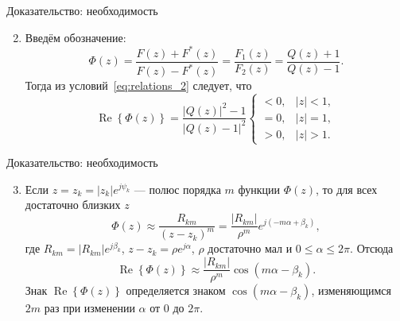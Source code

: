 \documentclass[notheorems,aspectratio=169]{beamer}
\theoremstyle{definition}
\newcommand{\abs}[1]{\left| #1 \right|}
\newcommand{\paren}[1]{\left(#1\right)}
\renewcommand{\Re}{\operatorname{Re}}
\begin{document}
\begin{frame}{Доказательство: необходимость}
  \begin{enumerate}
    \setcounter{enumi}{1}
  \item Введём обозначение:
    \begin{equation*}
      \Phi(z) = \frac{F(z) + F^*(z)}{F(z) - F^*(z)} = \frac{F_1(z)}{F_2(z)} = \frac{Q(z) + 1}{Q(z) - 1}.
    \end{equation*}
    Тогда из условий~\eqref{eq:relations_2} следует, что
    \begin{equation}\label{eq:relations_3}
      \Re \left\{ \Phi(z) \right\} = \frac{\abs{Q(z)}^2 - 1}{\abs{Q(z) - 1}^2}
      \begin{cases}
        < 0, & \abs{z} < 1, \\
        = 0, & \abs{z} = 1, \\
        > 0, & \abs{z} > 1.
      \end{cases}
    \end{equation}
  \end{enumerate}
\end{frame}

\begin{frame}{Доказательство: необходимость}
  \begin{enumerate}
    \setcounter{enumi}{2}
  \item Если $z = z_k = \abs{z_k} e^{j \psi_k}$ --- полюс порядка $m$ функции $\Phi(z)$, то для всех достаточно близких $z$
    \begin{equation*}
      \Phi(z) \approx \frac{R_{km}}{{(z - z_k)}^m} = \frac{\abs{R_{km}}}{\rho^m} e^{j (-m\alpha + \beta_k)},
    \end{equation*}
    где $R_{km} = \abs{R_{km}} e^{j \beta_k}$, $z - z_k = \rho e^{j\alpha}$, $\rho$ достаточно мал и $0 \leqslant \alpha \leqslant 2\pi$.
    Отсюда
    \begin{equation*}
      \Re \left\{ \Phi(z) \right\} \approx \frac{\abs{R_{km}}}{\rho^m} \cos\paren{m \alpha - \beta_k}.
    \end{equation*}
    Знак $\Re \left\{ \Phi(z) \right\}$ определяется знаком $\cos\paren{m \alpha - \beta_k}$, изменяющимся $2m$ раз
    при изменении $\alpha$ от $0$ до $2\pi$.
  \end{enumerate}
\end{frame}
\end{document}

